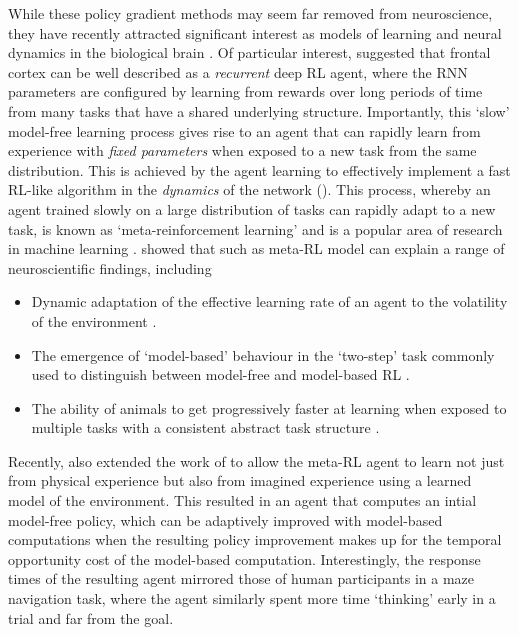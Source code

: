 While these policy gradient methods may seem far removed from neuroscience, they have recently attracted significant interest as models of learning and neural dynamics in the biological brain \citep{wang2018prefrontal, jensen2023recurrent, merel2019deep}.
Of particular interest, \citet{wang2018prefrontal} suggested that frontal cortex can be well described as a \emph{recurrent} deep RL agent, where the RNN parameters are configured by learning from rewards over long periods of time from many tasks that have a shared underlying structure.
Importantly, this `slow' model-free learning process gives rise to an agent that can rapidly learn from experience with \emph{fixed parameters} when exposed to a new task from the same distribution.
This is achieved by the agent learning to effectively implement a fast RL-like algorithm in the \emph{dynamics} of the network ().
This process, whereby an agent trained slowly on a large distribution of tasks can rapidly adapt to a new task, is known as `meta-reinforcement learning' and is a popular area of research in machine learning \citep{finn2017model, ritter2018been, duan2016rl, wang2016learning}.
\citet{wang2018prefrontal} showed that such as meta-RL model can explain a range of neuroscientific findings, including
\begin{itemize}
    \item Dynamic adaptation of the effective learning rate of an agent to the volatility of the environment \citep{behrens2007learning}.
    \item The emergence of `model-based' behaviour in the `two-step' task commonly used to distinguish between model-free and model-based RL \citep{miller2017dorsal,daw2011model}.
    \item The ability of animals to get progressively faster at learning when exposed to multiple tasks with a consistent abstract task structure \citep{harlow1949formation}.
\end{itemize}
Recently, \citet{jensen2023recurrent} also extended the work of \citet{wang2018prefrontal} to allow the meta-RL agent to learn not just from physical experience but also from imagined experience using a learned model of the environment.
This resulted in an agent that computes an intial model-free policy, which can be adaptively improved with model-based computations when the resulting policy improvement makes up for the temporal opportunity cost of the model-based computation.
Interestingly, the response times of the resulting agent mirrored those of human participants in a maze navigation task, where the agent similarly spent more time `thinking' early in a trial and far from the goal.

